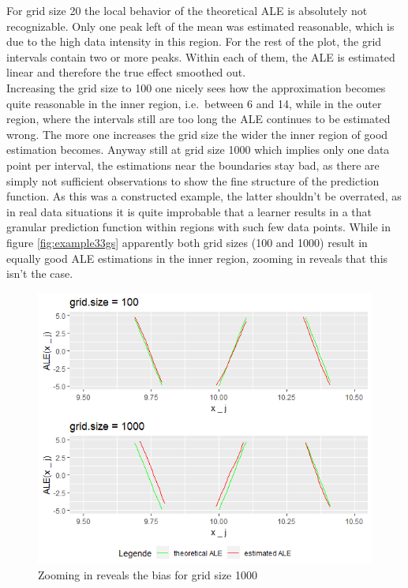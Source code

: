 \documentclass[
]{krantz}
\begin{document}
For grid size 20 the local behavior of the theoretical ALE is absolutely not recognizable. Only one peak left of the mean was estimated reasonable, which is due to the high data intensity in this region. For the rest of the plot, the grid intervals contain two or more peaks. Within each of them, the ALE is estimated linear and therefore the true effect smoothed out.\\
Increasing the grid size to 100 one nicely sees how the approximation becomes quite reasonable in the inner region, i.e.~between 6 and 14, while in the outer region, where the intervals still are too long the ALE continues to be estimated wrong.
The more one increases the grid size the wider the inner region of good estimation becomes. Anyway still at grid size 1000 which implies only one data point per interval, the estimations near the boundaries stay bad, as there are simply not sufficient observations to show the fine structure of the prediction function. As this was a constructed example, the latter shouldn't be overrated, as in real data situations it is quite improbable that a learner results in a that granular prediction function within regions with such few data points.
While in figure \ref{fig:example33gs} apparently both grid sizes (100 and 1000) result in equally good ALE estimations in the inner region, zooming in reveals that this isn't the case.

\begin{figure}
\includegraphics[width=1\linewidth]{images/ALE_2_example3_zoom_} \caption{Zooming in reveals the bias for grid size 1000}\label{fig:example3zoom}
\end{figure}
\end{document}
